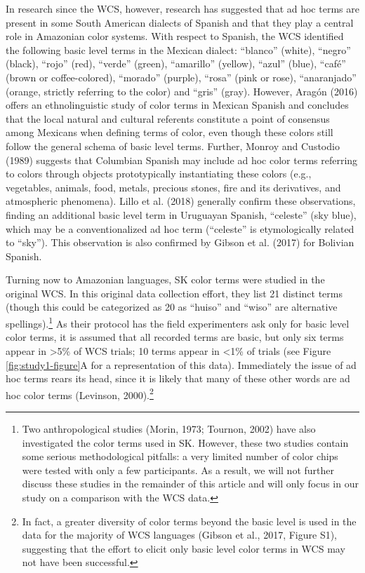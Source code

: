 \documentclass[
  english,
  ,apa7,floatsintext]{apa6}
\begin{document}
In research since the WCS, however, research has suggested that ad hoc terms are present in some South American dialects of Spanish and that they play a central role in Amazonian color systems. With respect to Spanish, the WCS identified the following basic level terms in the Mexican dialect: ``blanco'' (white), ``negro'' (black), ``rojo'' (red), ``verde'' (green), ``amarillo'' (yellow), ``azul'' (blue), ``café'' (brown or coffee-colored), ``morado'' (purple), ``rosa'' (pink or rose), ``anaranjado'' (orange, strictly referring to the color) and ``gris'' (gray). However, Aragón (2016) offers an ethnolinguistic study of color terms in Mexican Spanish and concludes that the local natural and cultural referents constitute a point of consensus among Mexicans when defining terms of color, even though these colors still follow the general schema of basic level terms. Further, Monroy and Custodio (1989) suggests that Columbian Spanish may include ad hoc color terms referring to colors through objects prototypically instantiating these colors (e.g., vegetables, animals, food, metals, precious stones, fire and its derivatives, and atmospheric phenomena). Lillo et al. (2018) generally confirm these observations, finding an additional basic level term in Uruguayan Spanish, ``celeste'' (sky blue), which may be a conventionalized ad hoc term (``celeste'' is etymologically related to ``sky''). This observation is also confirmed by Gibson et al. (2017) for Bolivian Spanish.

Turning now to Amazonian languages, SK color terms were studied in the original WCS. In this original data collection effort, they list 21 distinct terms (though this could be categorized as 20 as ``huiso'' and ``wiso'' are alternative spellings).\footnote{Two anthropological studies (Morin, 1973; Tournon, 2002) have also investigated the color terms used in SK. However, these two studies contain some serious methodological pitfalls: a very limited number of color chips were tested with only a few participants. As a result, we will not further discuss these studies in the remainder of this article and will only focus in our study on a comparison with the WCS data.} As their protocol has the field experimenters ask only for basic level color terms, it is assumed that all recorded terms are basic, but only six terms appear in \textgreater5\% of WCS trials; 10 terms appear in \textless1\% of trials (see Figure \ref{fig:study1-figure}A for a representation of this data). Immediately the issue of ad hoc terms rears its head, since it is likely that many of these other words are ad hoc color terms (Levinson, 2000).\footnote{In fact, a greater diversity of color terms beyond the basic level is used in the data for the majority of WCS languages (Gibson et al., 2017, Figure S1), suggesting that the effort to elicit only basic level color terms in WCS may not have been successful.}
\end{document}
